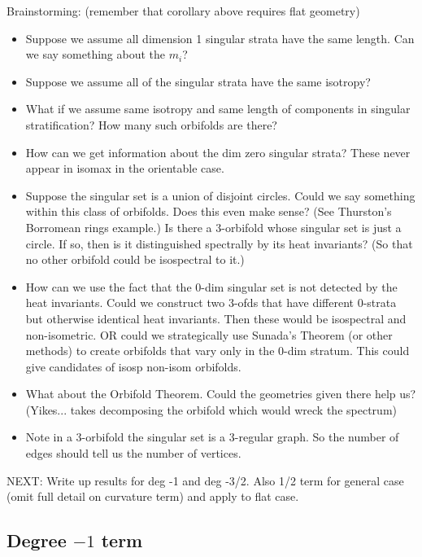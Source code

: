 \documentclass[12pt]{article}
\theoremstyle{definition}
\begin{document}
 Brainstorming:  (remember that corollary above requires flat geometry)
 \begin{itemize}
 \item Suppose we assume all dimension 1 singular strata have the same length.  Can we say something about the $m_i$?
 \item Suppose we assume all of the singular strata have the same isotropy?
 \item What if we assume same isotropy and same length of components in singular stratification?  How many such orbifolds are there?
 \item How can we get information about the dim zero singular strata?  These never appear in isomax in the orientable case.
 \item Suppose the singular set is a union of disjoint circles.  Could we say something within this class of orbifolds.  Does this even make sense?  (See Thurston's Borromean rings example.)  Is there a 3-orbifold whose singular set is just a circle.  If so, then is it distinguished spectrally by its heat invariants?  (So that no other orbifold could be isospectral to it.)
 \item How can we use the fact that the 0-dim singular set is not detected by the heat invariants.  Could we construct two  3-ofds that have different 0-strata but otherwise identical heat invariants.  Then these would be isospectral and non-isometric.  OR could we strategically use Sunada's Theorem (or other methods) to create orbifolds that vary only in the 0-dim stratum.  This could give candidates of isosp non-isom orbifolds.
 \item What about the Orbifold Theorem.  Could the geometries given there help us? (Yikes... takes decomposing the orbifold which would wreck the spectrum)
 \item Note in a 3-orbifold the singular set is a 3-regular graph.  So the number of edges should tell us the number of vertices.
 \end{itemize}

NEXT:  Write up results for deg -1 and deg -3/2.  Also 1/2 term for general case (omit full detail on curvature term) and apply to flat case.

\subsection{Degree $-1$ term}
\end{document}
